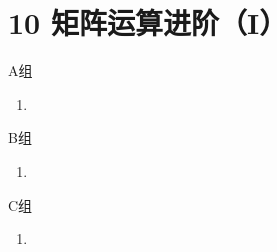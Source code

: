 \section*{10 矩阵运算进阶（I）}

\vspace{2ex}

\centerline{\heiti A组}
\begin{enumerate}
    \item
\end{enumerate}

\centerline{\heiti B组}
\begin{enumerate}
    \item
\end{enumerate}

\centerline{\heiti C组}
\begin{enumerate}
    \item
\end{enumerate}

\clearpage
